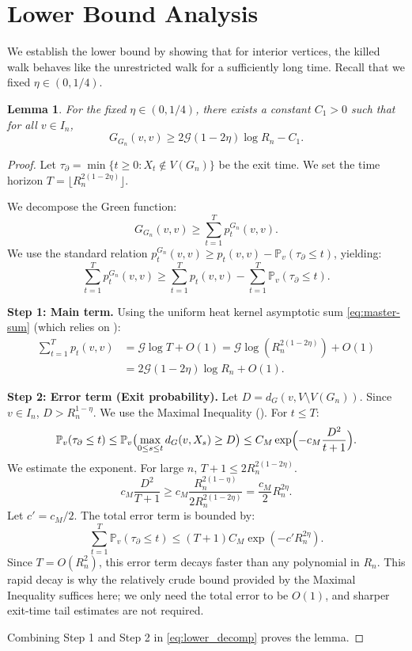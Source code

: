 \documentclass{article}
\numberwithin{equation}{section}
\newtheorem{lemma}[theorem]{Lemma}
\theoremstyle{definition}
\theoremstyle{remark}
\newcommand{\cG}{\mathcal{G}}
\newcommand{\Prob}{\mathbb{P}}
\begin{document}
\section{Lower Bound Analysis}\label{sec:lower_bound}

We establish the lower bound by showing that for interior vertices, the killed walk behaves like the unrestricted walk for a sufficiently long time. Recall that we fixed $\eta \in (0, 1/4)$.

\begin{lemma}\label{lem:lower}
For the fixed $\eta \in (0,1/4)$, there exists a constant $C_1 > 0$ such that for all $v \in I_n$,
\[
G_{G_n}(v,v) \geq 2\cG(1-2\eta)\log R_n - C_1.
\]
\end{lemma}

\begin{proof}
Let $\tau_{\partial} = \min\{t \geq 0 : X_t \notin V(G_n)\}$ be the exit time. We set the time horizon $T = \lfloor R_n^{2(1-2\eta)} \rfloor$.

We decompose the Green function:
\[
G_{G_n}(v,v) \geq \sum_{t=1}^{T} p_t^{G_n}(v,v).
\]
We use the standard relation $p_t^{G_n}(v,v) \geq p_t(v,v) - \Prob_v(\tau_{\partial} \leq t)$, yielding:
\begin{equation}\label{eq:lower_decomp}
\sum_{t=1}^{T} p_t^{G_n}(v,v) \geq \sum_{t=1}^{T} p_t(v,v) - \sum_{t=1}^{T} \Prob_v(\tau_{\partial} \leq t).
\end{equation}

\textbf{Step 1: Main term.} Using the uniform heat kernel asymptotic sum \eqref{eq:master-sum} (which relies on ):
\begin{align*}
\sum_{t=1}^{T} p_t(v,v) &= \cG \log T + O(1)
 = \cG \log(R_n^{2(1-2\eta)}) + O(1) \\
&= 2\cG (1-2\eta)\log R_n + O(1).
\end{align*}

\textbf{Step 2: Error term (Exit probability).} Let $D = d_G(v, V \setminus V(G_n))$. Since $v \in I_n$, $D > R_n^{1-\eta}$. We use the Maximal Inequality (). For $t \leq T$:
\[
\Prob_v(\tau_{\partial} \leq t) \leq \Prob_v\bigl( \max_{0 \leq s \leq t} d_G(v,X_s) \geq D \bigr) \leq C_M \exp\Bigl(-c_M \frac{D^2}{t+1}\Bigr).
\]
We estimate the exponent. For large $n$, $T+1 \leq 2 R_n^{2(1-2\eta)}$.
\[
c_M \frac{D^2}{T+1} \geq c_M \frac{R_n^{2(1-\eta)}}{2 R_n^{2(1-2\eta)}} = \frac{c_M}{2} R_n^{2\eta}.
\]
Let $c' = c_M/2$. The total error term is bounded by:
\[
\sum_{t=1}^T \Prob_v(\tau_{\partial} \leq t) \leq (T+1) C_M \exp(-c' R_n^{2\eta}).
\]
Since $T = O(R_n^2)$, this error term decays faster than any polynomial in $R_n$. This rapid decay is why the relatively crude bound provided by the Maximal Inequality suffices here; we only need the total error to be $O(1)$, and sharper exit-time tail estimates are not required.

Combining Step 1 and Step 2 in \eqref{eq:lower_decomp} proves the lemma.
\end{proof}
\end{document}
